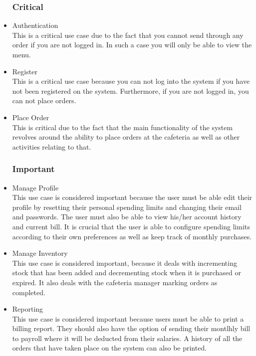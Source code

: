 \documentclass[a4paper,12pt]{article}
\begin{document}
\begin{itemize}

\subsubsection{Critical}
\item Authentication \\
This is a critical use case due to the fact that you cannot send through any order if you are not logged in. In such a case you will only be able to view the menu. 
 
\item Register \\
This is a critical use case because you can not log into the system if you have not been registered on the system. Furthermore, if you are not logged in, you can not place orders.

\item Place Order\\
This is critical due to the fact that the main functionality of the system revolves around the ability to place orders at the cafeteria as well as other activities relating to that. 

\subsubsection{Important}
\item Manage Profile \\
This use case is considered important because the user must be able edit their profile by resetting their personal spending limits and changing their email and passwords. The user must also be able to view his/her account history and current bill. It is crucial that the user is able to configure spending limits according to their own preferences as well as keep track of monthly purchases.

\item Manage Inventory \\
This use case is considered important, because it deals with incrementing stock that has been added and decrementing stock when it is purchased or expired. It also deals with the cafeteria manager marking orders as completed.

\item Reporting \\ 
This use case is considered important because users must be able to print a billing report. They should also have the option of sending their montlhly bill to payroll where it will be deducted from their salaries. A history of all the orders that have taken place on the system can also be printed. 


\end{itemize}
\end{document}
